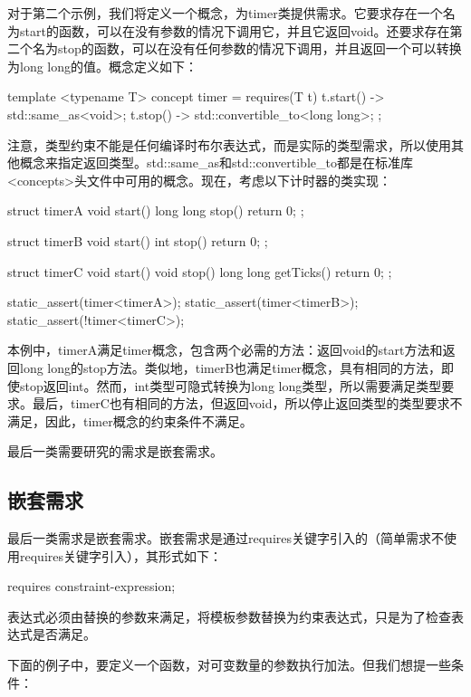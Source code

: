 对于第二个示例，我们将定义一个概念，为timer类提供需求。它要求存在一个名为start的函数，可以在没有参数的情况下调用它，并且它返回void。还要求存在第二个名为stop的函数，可以在没有任何参数的情况下调用，并且返回一个可以转换为long long的值。概念定义如下：

\begin{cppcode}
template <typename T>
concept timer = requires(T t)
{
	{t.start()} -> std::same_as<void>;
	{t.stop()} -> std::convertible_to<long long>;
};
\end{cppcode}

注意，类型约束不能是任何编译时布尔表达式，而是实际的类型需求，所以使用其他概念来指定返回类型。std::same_as和std::convertible_to都是在标准库<concepts>头文件中可用的概念。现在，考虑以下计时器的类实现：

\begin{cppcode}
struct timerA
{
	void start() {}
	long long stop() { return 0; }
};

struct timerB
{
	void start() {}
	int stop() { return 0; }
};

struct timerC
{
	void start() {}
	void stop() {}
	long long getTicks() { return 0; }
};

static_assert(timer<timerA>);
static_assert(timer<timerB>);
static_assert(!timer<timerC>);
\end{cppcode}

本例中，timerA满足timer概念，包含两个必需的方法：返回void的start方法和返回long long的stop方法。类似地，timerB也满足timer概念，具有相同的方法，即使stop返回int。然而，int类型可隐式转换为long long类型，所以需要满足类型要求。最后，timerC也有相同的方法，但返回void，所以停止返回类型的类型要求不满足，因此，timer概念的约束条件不满足。

最后一类需要研究的需求是嵌套需求。

\subsection{嵌套需求}

最后一类需求是嵌套需求。嵌套需求是通过requires关键字引入的（简单需求不使用requires关键字引入），其形式如下：

\begin{cppcode}
requires constraint-expression;
\end{cppcode}

表达式必须由替换的参数来满足，将模板参数替换为约束表达式，只是为了检查表达式是否满足。

下面的例子中，要定义一个函数，对可变数量的参数执行加法。但我们想提一些条件：

